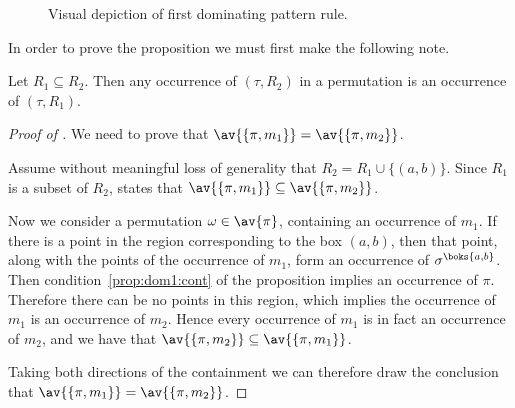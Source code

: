 \begin{figure}[htb]
    \begin{center}
        \raisebox{2ex}{\(\mapsto\)}

        \caption{Visual depiction of first dominating pattern rule.}
        \label{fig:rule1}
    \end{center}
\end{figure}

In order to prove the proposition we must first make the following note.

\begin{note}
    \label{not:downcmesh}
    Let \(R_1 \subseteq R_2\). Then any occurrence of \((\tau, R_2)\) in a permutation
    is an occurrence of \((\tau,R_1)\).
\end{note}

\begin{proof}[Proof of ]
    We need to prove that \(\av{\{\pi,m_1\}} = \av{\{\pi,m_2\}}\).

    \noindent Assume without meaningful loss of generality that \(R_2 = R_1 \cup \{(a,b)\}\).
    Since \(R_1\) is a subset of \(R_2\),  states that
    \(\av{\{\pi,m_1\}} \subseteq \av{\{\pi,m_2\}}\).

    Now we consider a permutation \(\omega \in \av{\pi}\),
    containing an occurrence of \(m_1\). If there is a point in the
    region corresponding to the box \((a,b)\), then that point, along with the
    points of the occurrence of \(m_1\), form an occurrence of \(\sigma^\boks{a,b}\).
    Then condition~\eqref{prop:dom1:cont} of the
    proposition implies an occurrence of \(\pi\). Therefore there can be no
    points in this region, which implies the occurrence of \(m_1\) is an occurrence of \(m_2\). Hence every occurrence of
    \(m_1\) is in fact an occurrence of \(m_2\), and we have that
    \(\av{\{\pi,m_2\}} \subseteq \av{\{\pi,m_1\}}\).

    Taking both directions of the containment we can therefore draw the
    conclusion that \(\av{\{\pi,m_1\}} = \av{\{\pi,m_2\}}\).
\end{proof}

